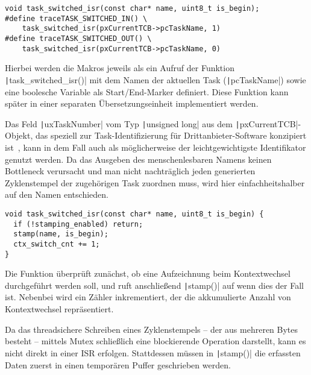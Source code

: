 \begin{code}
\begin{verbatim}
void task_switched_isr(const char* name, uint8_t is_begin);
#define traceTASK_SWITCHED_IN() \
    task_switched_isr(pxCurrentTCB->pcTaskName, 1)
#define traceTASK_SWITCHED_OUT() \
    task_switched_isr(pxCurrentTCB->pcTaskName, 0)
\end{verbatim}
\end{code}

Hierbei werden die Makros jeweils als ein Aufruf der Funktion
\texttt|task_switched_isr()| mit dem Namen der aktuellen Task
(\texttt|pcTaskName|) sowie eine boolesche Variable als
Start/End-Marker definiert. Diese Funktion kann später in einer separaten
Übersetzungseinheit implementiert werden.

Das Feld \texttt|uxTaskNumber| vom Typ \texttt|unsigned long|
aus dem \texttt|pxCurrentTCB|-Objekt, das speziell zur
Task-Identifizierung für Drittanbieter-Software konzipiert
ist~\cite{freertos_task_c_410}, kann in dem Fall auch als möglicherweise der
leichtgewichtigste Identifikator genutzt werden. Da das Ausgeben des
menschenlesbaren Namens keinen Bottleneck verursacht und man nicht nachträglich
jeden generierten Zyklenstempel der zugehörigen Task zuordnen muss, wird hier
einfachheitshalber auf den Namen entschieden.

\begin{code}
\begin{verbatim}
void task_switched_isr(const char* name, uint8_t is_begin) {
  if (!stamping_enabled) return;
  stamp(name, is_begin);
  ctx_switch_cnt += 1;
}
\end{verbatim}
\end{code}

Die Funktion überprüft zunächst, ob eine Aufzeichnung beim Kontextwechsel
durchgeführt werden soll, und ruft anschließend \texttt|stamp()| auf
wenn dies der Fall ist. Nebenbei wird ein Zähler inkrementiert, der die
akkumulierte Anzahl von Kontextwechsel repräsentiert.

Da das threadsichere Schreiben eines Zyklenstempels -- der aus mehreren Bytes
besteht -- mittels Mutex schließlich eine blockierende Operation darstellt, kann
es nicht direkt in einer ISR erfolgen. Stattdessen müssen in
\texttt|stamp()| die erfassten Daten zuerst in einen temporären Puffer
geschrieben werden.

